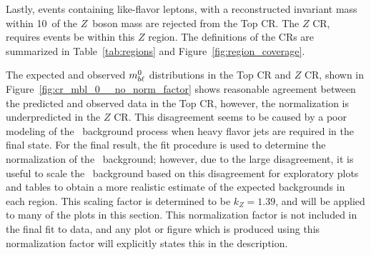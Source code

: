 Lastly, events containing like-flavor leptons, with a reconstructed invariant
mass within 10~\GeV of the $Z$~boson mass are rejected from the Top CR.
The $Z$ CR, requires events be within this $Z$ region.
The definitions of the CRs are summarized in Table~\ref{tab:regions} and
Figure~\ref{fig:region_coverage}.

The expected and observed $m_{b\ell}^{0}$ distributions in the Top CR and $Z$ CR,
shown in Figure~\ref{fig:cr_mbl_0__no_norm_factor} shows reasonable agreement
between the predicted and observed data in the Top CR, however, the
normalization is underpredicted in the $Z$ CR.
This disagreement seems to be caused by a poor modeling of the
\ZGAMMAJETS\ background process when heavy flavor jets are required in the
final state.
For the final result, the fit procedure is used to determine the normalization
of the \ZGAMMAJETS\ background; however, due to the large disagreement, it is
useful to scale the \ZGAMMAJETS\ background based on this disagreement for
exploratory plots and tables to obtain a more realistic estimate of the expected
backgrounds in each region.
This scaling factor is determined to be $k_Z = 1.39$, and will be applied to
many of the plots in this section.
This normalization factor is not included in the final fit to data, and any plot
or figure which is produced using this normalization factor will explicitly
states this in the description.

